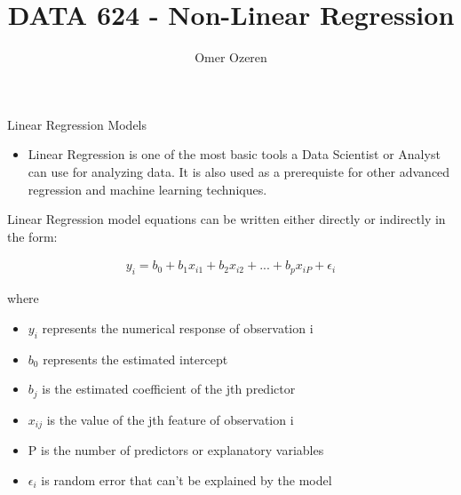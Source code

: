 \documentclass[ignorenonframetext,]{beamer}
\title{DATA 624 - Non-Linear Regression}
\author{Omer Ozeren}
\date{}
\providecommand{\tightlist}{%
  \setlength{\itemsep}{0pt}\setlength{\parskip}{0pt}}
\begin{document}
\frame{\titlepage}

\begin{frame}{Linear Regression Models}

\begin{itemize}
\tightlist
\item
  Linear Regression is one of the most basic tools a Data Scientist or
  Analyst can use for analyzing data. It is also used as a prerequiste
  for other advanced regression and machine learning techniques.
\end{itemize}

\begin{block}{Linear Regression model equations can be written either
directly or indirectly in the form:}

\[
\begin{align}
y_i = b_0 +b_1x_{i1} + b_2x_{i2} + ... + b_px_{iP} + \epsilon_i \tag{1}
\end{align}
\]

where

\begin{itemize}
\tightlist
\item
  \(y_i\) represents the numerical response of observation i
\item
  \(b_0\) represents the estimated intercept
\item
  \(b_j\) is the estimated coefficient of the jth predictor
\item
  \(x_{ij}\) is the value of the jth feature of observation i
\item
  P is the number of predictors or explanatory variables
\item
  \(\epsilon_i\) is random error that can't be explained by the model
\end{itemize}

\end{block}

\end{frame}
\end{document}

